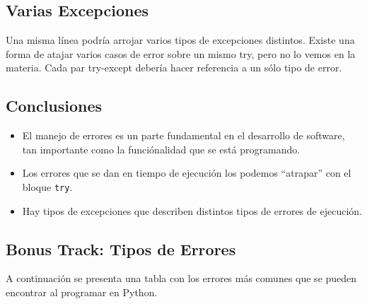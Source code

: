 \documentclass[
  letterpaper,
  DIV=11,
  numbers=noendperiod]{scrreprt}
\providecommand{\tightlist}{%
  \setlength{\itemsep}{0pt}\setlength{\parskip}{0pt}}\usepackage{longtable,booktabs,array}
\begin{document}
\subsection{Varias Excepciones}\label{varias-excepciones}

Una misma línea podría arrojar varios tipos de excepciones distintos.
Existe una forma de atajar varios casos de error sobre un mismo try,
pero no lo vemos en la materia. Cada par try-except debería hacer
referencia a un sólo tipo de error.

\subsection{Conclusiones}\label{conclusiones-1}

\begin{itemize}
\tightlist
\item
  El manejo de errores es un parte fundamental en el desarrollo de
  software, tan importante como la funciónalidad que se está
  programando.
\item
  Los errores que se dan en tiempo de ejecución los podemos ``atrapar''
  con el bloque \texttt{try}.
\item
  Hay tipos de excepciones que describen distintos tipos de errores de
  ejecución.
\end{itemize}

\subsection{Bonus Track: Tipos de
Errores}\label{bonus-track-tipos-de-errores}

A continuación se presenta una tabla con los errores más comunes que se
pueden encontrar al programar en Python.
\end{document}
